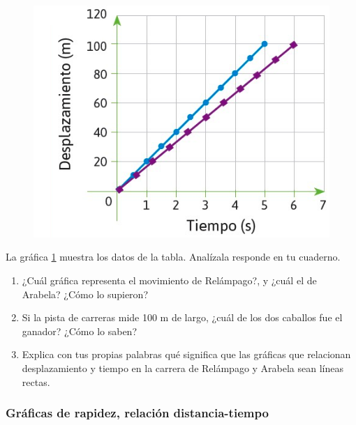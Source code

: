 \documentclass[11pt]{book}
\begin{document}
\begin{minipage}[t]{0.5\linewidth}
    \begin{figure}[H]
        \centering
        \includegraphics[width=\linewidth]{caballos_fig.jpg}
        \label{fig:caballos_fig}
    \end{figure}
\end{minipage}
\begin{minipage}[t]{0.5\linewidth}
    La gráfica \ref{fig:caballos_fig} muestra los datos de la tabla. Analízala  responde en tu cuaderno.
    \begin{enumerate}
        \item ¿Cuál gráfica representa el movimiento de Relámpago?, y ¿cuál el de Arabela?
              ¿Cómo lo supieron?\\[1cm]
        \item Si la pista de carreras mide 100 m de largo, ¿cuál de los dos caballos fue el ganador?
              ¿Cómo lo saben?\\[1cm]
        \item Explica con tus propias palabras qu\'e significa que las gr\'aficas que relacionan
              desplazamiento y tiempo en la carrera de Relámpago y Arabela sean líneas rectas.\\[1cm]
    \end{enumerate}
\end{minipage}

\subsubsection{Gráficas de rapidez, relación distancia-tiempo}
\end{document}
